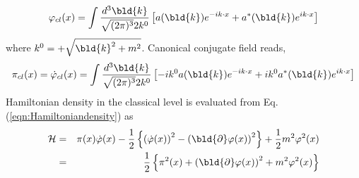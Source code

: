 \begin{equation}
\varphi_{cl}(x) = \int \frac{d^3 \bld{k}}{\sqrt{(2\pi)^3}2k^0} \left[
a(\bld{k}) e^{-i k \cdot x} + a^*(\bld{k})e^{i k \cdot x} \right]
\label{eqn:KGclassicalsol}
\end{equation}
where $k^0 = + \sqrt{\bld{k}^2 + m^2}$. 
Canonical conjugate field reads,
\begin{equation}
\pi_{cl}(x) = \dot{\varphi}_{cl}(x)
=
\int \frac{d^3 \bld{k}}{\sqrt{(2\pi)^3}2k^0}  \left[
- i k^0 a(\bld{k}) e^{-i k \cdot x} + i k^0 a^*(\bld{k})e^{i k \cdot x} \right]
\label{eqn:KGclassicalpi}
\end{equation}
Hamiltonian density in the classical level is evaluated from Eq. (\ref{eqn:Hamiltoniandensity}) as
\begin{eqnarray}
{\cal H} &=& \pi(x) \dot{\varphi}(x) - \frac{1}{2} \left\{
\left( \dot{\varphi}(x) \right)^2 - 
\left( \bld{\partial} \varphi(x) \right)^2 \right\}
+ \frac{1}{2} m^2 \varphi^2(x)
\nonumber\\
&=&
\frac{1}{2} \left\{
\pi^2 (x) + \left( \bld{\partial} \varphi(x) \right)^2 + m^2 \varphi^2(x)
\right\}
\label{eqn:KGHamiltoniandens}
\end{eqnarray}
